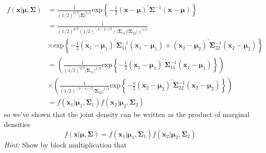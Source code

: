 \begin{equation*}
    \begin{aligned}
        f(\textbf{x}|\bm{\mu},\bm{\Sigma})
        & =
        \frac{1}{{(1/2)}^{p/2}{\left|\bm{\Sigma}\right|}^{1/2}}
        \text{exp}\left\{-\frac{1}{2}{(\textbf{x} - \bm{\mu})}^{\prime}\bm{\Sigma}^{-1}(\textbf{x} - \bm{\mu})\right\} \\
        & = 
        \frac{1}{
            {(1/2)}^{q/2}
            {(1/2)}^{(p-q)/2}
            {(
                \left|
                    \bm{\Sigma}_{11}
                \right|
                \left|
                    \bm{\Sigma}_{22}
                \right|
            )}^{1/2}
        } \\
        & \times
        \text{exp}
        \left\{
            -\frac{1}{2}
            {(\textbf{x}_1 - \bm{\mu}_1)}^{\prime}
            \bm{\Sigma}_{11}^{-1}
            (\textbf{x}_1 - \bm{\mu}_1)
            +
            {(\textbf{x}_2 - \bm{\mu}_2)}^{\prime}
            \bm{\Sigma}_{22}^{-1}
            (\textbf{x}_2 - \bm{\mu}_2)
        \right\} \\
        & =
        \left(
            \frac{1}{
                {(1/2)}^{q/2}
                {\left|
                    \bm{\Sigma}_{11}
                \right|}^{1/2}
            }
            \text{exp}
            \left\{
                -\frac{1}{2}
                {(\textbf{x}_1 - \bm{\mu}_1)}^{\prime}
                \bm{\Sigma}_{11}^{-1}
                (\textbf{x}_1 - \bm{\mu}_1)
            \right\}
        \right) \\
        & \times
        \left(
            \frac{1}{
                {(1/2)}^{(p-q)/2}
                {\left|
                    \bm{\Sigma}_{22}
                \right|}^{1/2}
            }
            \text{exp}
            \left\{
                -\frac{1}{2}
                {(\textbf{x}_2 - \bm{\mu}_2)}^{\prime}
                \bm{\Sigma}_{22}^{-1}
                (\textbf{x}_2 - \bm{\mu}_2)
            \right\}
        \right) \\
        & =
        f(\textbf{x}_{1}|\bm{\mu}_{1},\bm{\Sigma}_{1})
        f(\textbf{x}_{2}|\bm{\mu}_{2},\bm{\Sigma}_{2})
    \end{aligned}
\end{equation*}
so we've shown that the joint density can be written as the product of marginal densities
\[
    f(\textbf{x}|\bm{\mu},\bm{\Sigma})
    =
    f(\textbf{x}_{1}|\bm{\mu}_{1},\bm{\Sigma}_{1})
    f(\textbf{x}_{2}|\bm{\mu}_{2},\bm{\Sigma}_{2})
\]
\textit{Hint:} Show by block multiplication that

